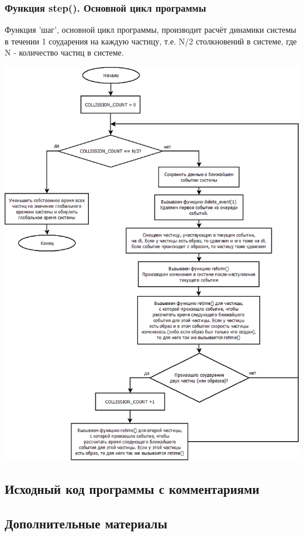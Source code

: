 \documentclass[a4paper]{article}
\begin{document}
\newpage
\subsubsection{Функция step(). Основной цикл программы }

Функция 'шаг', основной цикл программы, производит расчёт динамики системы в течении 1 соударения на каждую частицу, т.е. N/2 столкновений в системе, где N - количество частиц в системе.

\begin{center}
\includegraphics[scale=0.45]{step.png}
\end{center}


\begin{landscape}

\subsection{Исходный код программы с комментариями}



\end{landscape}
\subsection{Дополнительные материалы}
\end{document}
